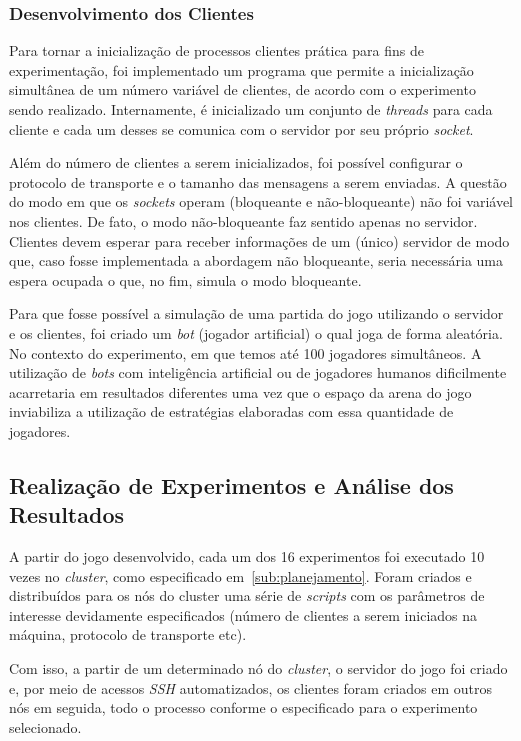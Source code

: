 \documentclass[12pt]{article}
\begin{document}
\subsubsection{Desenvolvimento dos Clientes}

Para tornar a inicialização de processos clientes prática para fins de
experimentação, foi implementado um programa que permite a inicialização
simultânea de um número variável de clientes, de acordo com o experimento sendo
realizado. Internamente, é inicializado um conjunto de \textit{threads} para
cada cliente e cada um desses se comunica com o servidor por seu próprio
\textit{socket}.

Além do número de clientes a serem inicializados, foi possível configurar o
protocolo de transporte e o tamanho das mensagens a serem enviadas. A questão
do modo em que os \textit{sockets} operam (bloqueante e não-bloqueante) não foi
variável nos clientes. De fato, o modo não-bloqueante faz sentido apenas no
servidor. Clientes devem esperar para receber informações de um (único)
servidor de modo que, caso fosse implementada a abordagem não bloqueante, seria
necessária uma espera ocupada o que, no fim, simula o modo bloqueante.

Para que fosse possível a simulação de uma partida do jogo utilizando o
servidor e os clientes, foi criado um \textit{bot} (jogador artificial) o qual
joga de forma aleatória. No contexto do experimento, em que temos até 100
jogadores simultâneos.  A utilização de \textit{bots} com inteligência
artificial ou de jogadores humanos dificilmente acarretaria em resultados
diferentes uma vez que o espaço da arena do jogo inviabiliza a utilização de
estratégias elaboradas com essa quantidade de jogadores.

\subsection{Realização de Experimentos e Análise dos Resultados} \label{sub:realizacao} 

A partir do jogo desenvolvido, cada um dos 16 experimentos foi executado 10
vezes no \textit{cluster}, como especificado em~\ref{sub:planejamento}. Foram
criados e distribuídos para os nós do cluster uma série de \textit{scripts}
com os parâmetros de interesse devidamente especificados (número de clientes a
serem iniciados na máquina, protocolo de transporte etc).

Com isso, a partir de um determinado nó do \textit{cluster}, o servidor do jogo
foi criado e, por meio de acessos \emph{SSH} automatizados, os clientes foram criados
em outros nós em seguida, todo o processo conforme o especificado para o
experimento selecionado.
\end{document}
